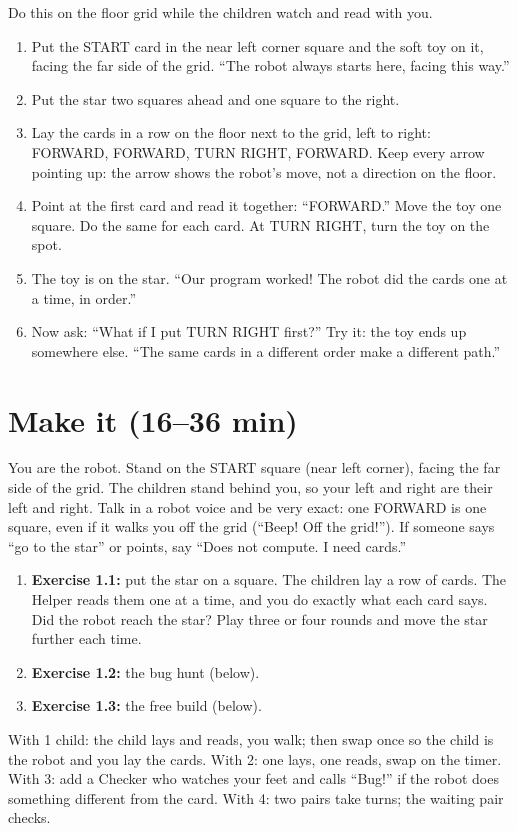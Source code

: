 \begin{workedexample}
Do this on the floor grid while the children watch and read with you.
\begin{enumerate}[leftmargin=1.4em,itemsep=1pt]
  \item Put the START card in the near left corner square and the soft toy on it, facing the far side of the grid. \enquote{The robot always starts here, facing this way.}
  \item Put the star two squares ahead and one square to the right.
  \item Lay the cards in a row on the floor next to the grid, left to right: FORWARD, FORWARD, TURN RIGHT, FORWARD. Keep every arrow pointing up: the arrow shows the robot's move, not a direction on the floor.
  \item Point at the first card and read it together: \enquote{FORWARD.} Move the toy one square. Do the same for each card. At TURN RIGHT, turn the toy on the spot.
  \item The toy is on the star. \enquote{Our program worked! The robot did the cards one at a time, in order.}
  \item Now ask: \enquote{What if I put TURN RIGHT first?} Try it: the toy ends up somewhere else. \enquote{The same cards in a different order make a different path.}
\end{enumerate}
\end{workedexample}

\section{Make it (16--36 min)}
\begin{unplugged}
You are the robot. Stand on the START square (near left corner), facing the far side of the grid. The children stand behind you, so your left and right are their left and right. Talk in a robot voice and be very exact: one FORWARD is one square, even if it walks you off the grid (\enquote{Beep! Off the grid!}). If someone says \enquote{go to the star} or points, say \enquote{Does not compute. I need cards.}
\begin{enumerate}[leftmargin=1.4em,itemsep=1pt]
  \item \textbf{Exercise 1.1:} put the star on a square. The children lay a row of cards. The Helper reads them one at a time, and you do exactly what each card says. Did the robot reach the star? Play three or four rounds and move the star further each time.
  \item \textbf{Exercise 1.2:} the bug hunt (below).
  \item \textbf{Exercise 1.3:} the free build (below).
\end{enumerate}
With 1 child: the child lays and reads, you walk; then swap once so the child is the robot and you lay the cards. With 2: one lays, one reads, swap on the timer. With 3: add a Checker who watches your feet and calls \enquote{Bug!} if the robot does something different from the card. With 4: two pairs take turns; the waiting pair checks.
\end{unplugged}

